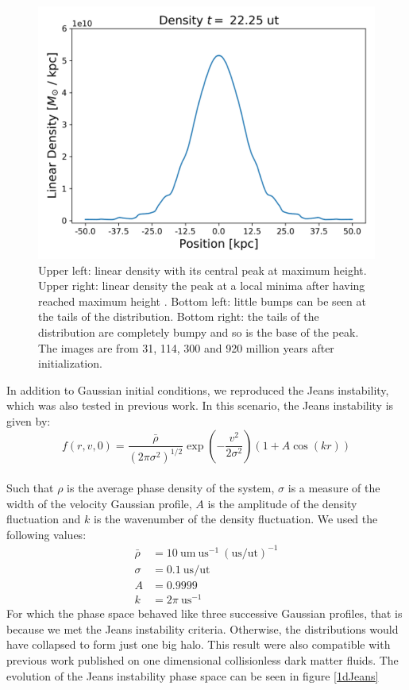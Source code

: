 \begin{figure}[h!]
    \includegraphics[scale=0.45]{imag/gaussD89.png}
    \caption{Upper left: linear density with its central peak at maximum height. Upper right: linear density the peak at a local minima after having reached maximum height . Bottom left: little bumps can be seen at the tails of the distribution. Bottom right: the tails of the distribution are completely bumpy and so is the base of the peak. The images are from 31, 114, 300 and 920 million years after initialization.  }
    \label{1dDens}
\end{figure}

In addition to Gaussian initial conditions, we reproduced the Jeans instability, which was also tested in previous work. In this scenario, the Jeans instability is given by:
\begin{equation}
f(r,v,0) = \frac{\bar{\rho}}{(2 \pi \sigma^2)^{1/2}} \exp(-\frac{v^2}{2 \sigma^2}) (1 + A \cos(kr))
\end{equation}\\
\vspace{-1mm}Such that $\rho$ is the average phase density of the system, $\sigma$ is a measure of the width of the velocity Gaussian profile, $A$ is the amplitude of the density fluctuation and $k$ is the wavenumber of the density fluctuation. We used the following values:
\begin{align}
\bar{\rho} &= 10 \  \text{um} \ \text{us}^{-1} \ (\text{us/ut})^{-1} \\
\sigma &= 0.1 \ \text{us/ut} \\
A &= 0.9999 \\
k &= 2 \pi \ \text{us}^{-1}
\end{align}
For which the phase space behaved like three successive Gaussian profiles, that is because we met the Jeans instability criteria. Otherwise, the distributions would have collapsed to form just one big halo. This result were also compatible with previous work published on one dimensional collisionless dark matter fluids. The evolution of the Jeans instability phase space can be seen in figure \ref{1dJeans}


